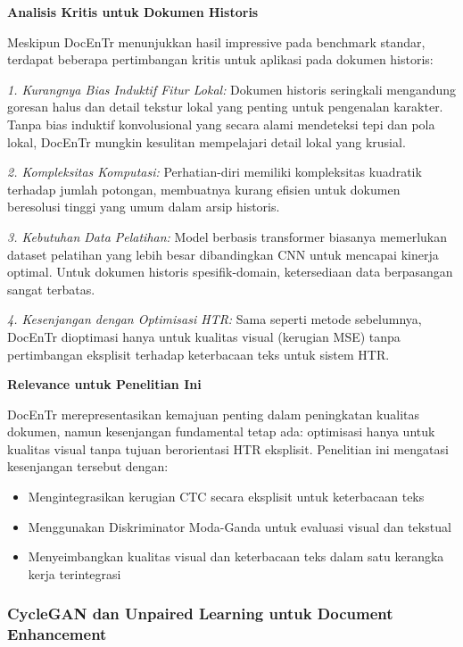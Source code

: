 \documentclass[12pt,a4paper]{article}
\begin{document}
\textbf{Analisis Kritis untuk Dokumen Historis}

Meskipun DocEnTr menunjukkan hasil impressive pada benchmark standar, terdapat beberapa pertimbangan kritis untuk aplikasi pada dokumen historis:

\textit{1. Kurangnya Bias Induktif Fitur Lokal:} Dokumen historis seringkali mengandung goresan halus dan detail tekstur lokal yang penting untuk pengenalan karakter. Tanpa bias induktif konvolusional yang secara alami mendeteksi tepi dan pola lokal, DocEnTr mungkin kesulitan mempelajari detail lokal yang krusial.

\textit{2. Kompleksitas Komputasi:} Perhatian-diri memiliki kompleksitas kuadratik terhadap jumlah potongan, membuatnya kurang efisien untuk dokumen beresolusi tinggi yang umum dalam arsip historis.

\textit{3. Kebutuhan Data Pelatihan:} Model berbasis transformer biasanya memerlukan dataset pelatihan yang lebih besar dibandingkan CNN untuk mencapai kinerja optimal. Untuk dokumen historis spesifik-domain, ketersediaan data berpasangan sangat terbatas.

\textit{4. Kesenjangan dengan Optimisasi HTR:} Sama seperti metode sebelumnya, DocEnTr dioptimasi hanya untuk kualitas visual (kerugian MSE) tanpa pertimbangan eksplisit terhadap keterbacaan teks untuk sistem HTR.

\textbf{Relevance untuk Penelitian Ini}

DocEnTr merepresentasikan kemajuan penting dalam peningkatan kualitas dokumen, namun kesenjangan fundamental tetap ada: optimisasi hanya untuk kualitas visual tanpa tujuan berorientasi HTR eksplisit. Penelitian ini mengatasi kesenjangan tersebut dengan:

\begin{itemize}
    \item Mengintegrasikan kerugian CTC secara eksplisit untuk keterbacaan teks
    \item Menggunakan Diskriminator Moda-Ganda untuk evaluasi visual dan tekstual
    \item Menyeimbangkan kualitas visual dan keterbacaan teks dalam satu kerangka kerja terintegrasi
\end{itemize}

\subsubsection{CycleGAN dan Unpaired Learning untuk Document Enhancement}
\label{subsubsec:cyclegan}
\end{document}
